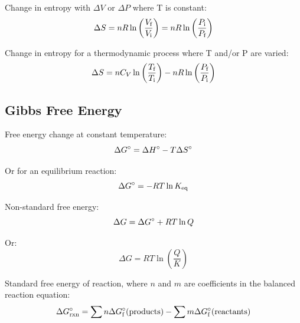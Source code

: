 \documentclass[10pt]{article}
\begin{document}
Change in entropy with $\Delta V$ or $\Delta P$ where T is constant:
\begin{equation*}
\Delta S = nR\ln \left(\frac{V_\textnormal{f}}{V_\textnormal{i}}\right) = nR\ln \left(\frac{P_\textnormal{i}}{P_\textnormal{f}}\right)
\end{equation*}

Change in entropy for a thermodynamic process where T and/or P are varied:
\begin{equation*}
\Delta S = nC_V\ln\left(\frac{T_\textnormal{f}}{T_\textnormal{i}}\right) - nR\ln\left(\frac{P_\textnormal{f}}{P_\textnormal{i}}\right)
\end{equation*}


\subsection{Gibbs Free Energy}

Free energy change at constant temperature:
\begin{equation*}
\Delta G\not = \Delta H\not - T \Delta S\not
\end{equation*}

Or for an equilibrium reaction:
\begin{equation*}
\Delta G\not = -RT\ln K_{\textnormal{eq}}
\end{equation*}

Non-standard free energy:
\begin{equation*}
\Delta G = \Delta G\not + RT\ln Q
\end{equation*}

Or:
\begin{equation*}
\Delta G = RT \ln \left(\frac{Q}{K}\right)
\end{equation*}


Standard free energy of reaction, where $n$ and $m$ are coefficients in the balanced reaction equation:
\begin{equation*}
\Delta G\not_\textnormal{rxn} = \sum{n\Delta G\not_\textnormal{f}(\textnormal{products})}-\sum{m\Delta G\not_\textnormal{f}(\textnormal{reactants})}
\end{equation*}
\end{document}
